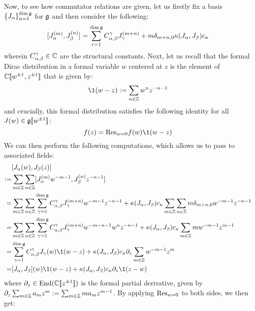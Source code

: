             Now, to see how commutator relations are given, let us firstly fix a basis $\{J_{\alpha}\}_{\alpha = 1}^{\dim \mathfrak{g}}$ for $\mathfrak{g}$ and then consider the following:
                $$[J_{\alpha}^{(m)}, J_{\beta}^{(n)}] = \sum_{r = 1}^{\dim \mathfrak{g}} C_{\alpha, \beta}^{\gamma} J_{\gamma}^{(m + n)} + m \delta_{m + n, 0} \kappa(J_{\alpha}, J_{\beta}) c_{\kappa}$$
            wherein $C_{\alpha, \beta}^{\gamma} \in \mathbb{C}$ are the structural constants. Next, let us recall that the formal Dirac distribution in a formal variable $w$ centered at $z$ is the element of $\mathbb{C}[\![w^{\pm 1}, z^{\pm 1}]\!]$ that is given by:
                $$\1(w - z) := \sum_{n \in \Z} w^n z^{-n - 1}$$
            and crucially, this formal distribution satisfies the following identity for all $J(w) \in \mathfrak{g}[\![w^{\pm 1}]\!]$:
                $$f(z) = \Res_{w = 0} f(w) \1(w - z)$$
            We can then perform the following computations, which allows us to pass to associated fields:
                $$
                    \begin{aligned}
                        & [J_{\alpha}(w), J_{\beta}(z)]
                        \\
                        := & \sum_{m \in \Z} \sum_{n \in \Z} [J_{\alpha}^{(m)} w^{-m - 1}, J_{\beta}^{(n)} z^{-n - 1}]
                        \\
                        = & \sum_{m \in \Z} \sum_{n \in \Z} \sum_{\gamma = 1}^{\dim \g} C_{\alpha, \beta}^{\gamma} J_{\gamma}^{(m + n)} w^{-m - 1} z^{-n - 1} + \kappa(J_{\alpha}, J_{\beta}) c_{\kappa} \sum_{m \in \Z} \sum_{n \in \Z} m \delta_{m + n, 0} w^{-m - 1} z^{-n - 1}
                        \\
                        = & \sum_{m \in \Z} \sum_{n \in \Z} \sum_{\gamma = 1}^{\dim \g} C_{\alpha, \beta}^{\gamma} J_{\gamma}^{(m + n)} w^{-m - n - 1} w^n z^{-n - 1} + \kappa(J_{\alpha}, J_{\beta}) c_{\kappa} \sum_{m \in \Z} m w^{-m - 1} z^{m - 1}
                        \\
                        = & \sum_{\gamma = 1}^{\dim \g} C_{\alpha, \beta}^{\gamma} J_{\gamma}(w) \1(w - z) + \kappa(J_{\alpha}, J_{\beta}) c_{\kappa} \del_z \sum_{m \in \Z} w^{-m - 1} z^m
                        \\
                        = & [J_{\alpha}, J_{\beta}](w) \1(w - z) + \kappa(J_{\alpha}, J_{\beta}) c_{\kappa} \del_z \1(z - w)
                    \end{aligned}
                $$
            where $\partial_z \in \mathrm{End}( \mathbb{C}[\![z^{\pm 1}]\!] )$ is the formal partial derivative, given by $\partial_z \sum_{m \in \mathbb{Z}} a_m z^m := \sum_{m \in \mathbb{Z}} m a_m z^{m - 1}$. By applying $\mathrm{Res}_{w = 0}$ to both sides, we then get:
